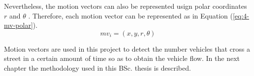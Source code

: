 Nevertheless, the motion vectors can also be represented usign polar coordinates $r$ and $\theta$ \cite{GRMSJ12}. Therefore, each motion vector can be represented as in Equation (\ref{eq:4-mv-polar}).
\begin{equation} \label{eq:4-mv-polar}
mv_{i} = (x, y, r, \theta)
\end{equation}

Motion vectors are used in this project to detect the number vehicles that cross a street in a certain amount of time so as to obtain the vehicle flow. In the next chapter the methodology used in this \ac{BSc.} thesis is described.



